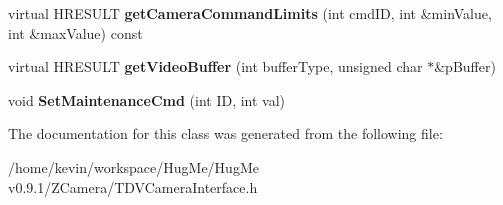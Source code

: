 \begin{DoxyCompactItemize}
\item 
\hypertarget{classTDVCameraInterfaceBase_a8734112fa15f5cfe893a9aab872cf12a}{
virtual HRESULT {\bfseries getCameraCommandLimits} (int cmdID, int \&minValue, int \&maxValue) const }
\label{classTDVCameraInterfaceBase_a8734112fa15f5cfe893a9aab872cf12a}

\item 
\hypertarget{classTDVCameraInterfaceBase_a38695ddb9698f59037add68798257aac}{
virtual HRESULT {\bfseries getVideoBuffer} (int bufferType, unsigned char $\ast$\&pBuffer)}
\label{classTDVCameraInterfaceBase_a38695ddb9698f59037add68798257aac}

\item 
\hypertarget{classTDVCameraInterfaceBase_a5cdbb3ec301333c9c573fb58b50683b1}{
void {\bfseries SetMaintenanceCmd} (int ID, int val)}
\label{classTDVCameraInterfaceBase_a5cdbb3ec301333c9c573fb58b50683b1}

\end{DoxyCompactItemize}


The documentation for this class was generated from the following file:\begin{DoxyCompactItemize}
\item 
/home/kevin/workspace/HugMe/HugMe v0.9.1/ZCamera/TDVCameraInterface.h\end{DoxyCompactItemize}
